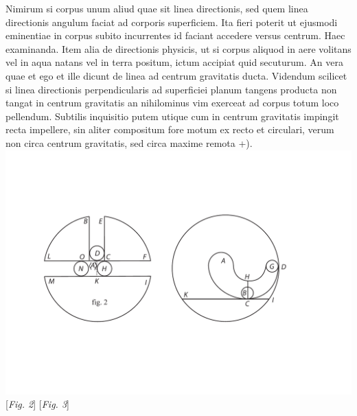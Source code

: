 Nimirum si corpus unum  aliud  quae sit linea directionis, sed quem linea directionis angulum faciat ad corporis superficiem. Ita fieri poterit ut ejusmodi eminentiae in corpus subito incurrentes id faciant accedere versus centrum. Haec examinanda. Item alia de  directionis physicis, ut si corpus aliquod in aere volitans vel in aqua natans vel in terra positum, ictum\protect{} accipiat quid secuturum. An vera quae et ego et ille dicunt de linea ad centrum gravitatis\protect{} ducta. Videndum scilicet si linea directionis perpendicularis ad superficiei planum tangens producta non tangat in centrum gravitatis an nihilominus vim exerceat ad corpus totum loco pellendum. Subtilis inquisitio putem utique cum in centrum gravitatis\protect{} impingit recta impellere, sin aliter compositum fore motum ex recto et circulari, verum non circa centrum gravitatis, sed circa maxime remota +). 
\pend 
\pstart
\centering 
\includegraphics[width=1.0\textwidth]{images/lh0351402_103v23.pdf}
\pend
\vspace{0.5em}
\pstart
\hspace{20mm}[\textit{Fig. 2}] \hspace{54mm} [\textit{Fig. 3}]
